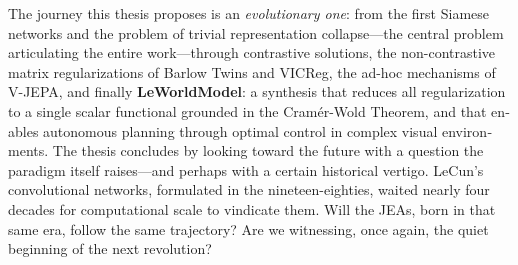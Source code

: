 \documentclass[12pt, oneside, openany]{book}
\begin{document}
\begin{otherlanguage}{english}
The journey this thesis proposes is an \textit{evolutionary one}: from the first Siamese networks and the problem of trivial representation collapse---the central problem articulating the entire work---through contrastive solutions, the non-contrastive matrix regularizations of Barlow Twins and VICReg, the ad-hoc mechanisms of V-JEPA, and finally \textbf{LeWorldModel}: a synthesis that reduces all regularization to a single scalar functional grounded in the Cram\'er-Wold Theorem, and that enables autonomous planning through optimal control in complex visual environments. The thesis concludes by looking toward the future with a question the paradigm itself raises---and perhaps with a certain historical vertigo. LeCun's convolutional networks, formulated in the nineteen-eighties, waited nearly four decades for computational scale to vindicate them. Will the JEAs, born in that same era, follow the same trajectory? Are we witnessing, once again, the quiet beginning of the next revolution?
\end{otherlanguage}











\appendix



\backmatter



\end{document}
